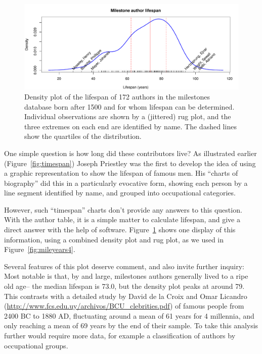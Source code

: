 \documentclass[11pt]{article}
\newcommand*{\figref}[1]{Figure~\ref{#1}}
\begin{document}
\begin{figure}[!htb]
  \centering
  \includegraphics[width=\textwidth,clip]{fig/lifespan}
  \caption{Density plot of the lifespan of 172 authors in the milestones database born after 1500 and for whom
  lifespan can be determined. Individual observations are shown by a (jittered) rug plot, and the three extremes
  on each end are identified by name.  The dashed lines show the quartiles of the distribution.
  }
  \label{fig:lifespan}
\end{figure}

One simple question is how long did these contributors live? As illustrated earlier (\figref{fig:timespan})
Joseph Priestley was the first to develop the idea of using a graphic representation to show
the lifespan of famous men. His ``charts of biography'' did this in a particularly evocative
form, showing each person by a line segment identified by name, and grouped into
occupational categories.

However, such ``timespan'' charts don't provide any answers to this question.  With the
author table, it is a simple matter to calculate lifespan, and give a direct answer
with the help of software.  \figref{fig:lifespan} shows one display of this information,
using a combined density plot and rug plot, as we used in \figref{fig:mileyears4}.

Several features of this plot deserve comment, and also invite further inquiry:
Most notable is that, by and large, milestones authors generally lived to a ripe old age--
the median lifespan is 73.0, but the density plot peaks at around 79.
This contrasts with a detailed study by
David de la Croix and Omar Licandro (\url{http://www.fcs.edu.uy/archivos/BCU_clebrities.pdf})
of famous people from 2400 BC to 1880 AD,
fluctuating around a mean of 61 years for 4 millennia, and only reaching a mean of 69 years
by the end of their sample. To take this analysis further would require more data, for example
a classification of authors by occupational groups.
\end{document}
